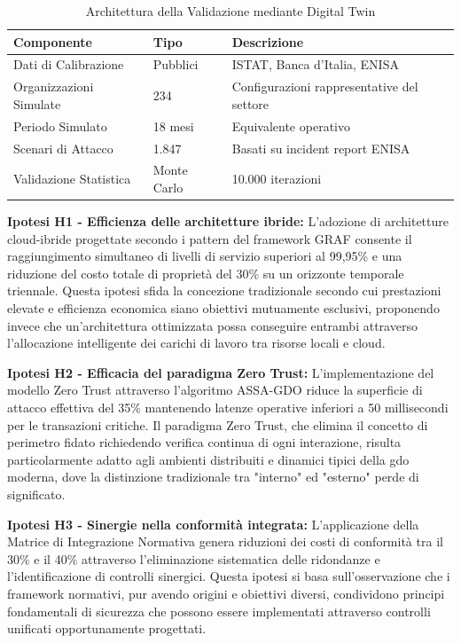 \begin{table}[h]
\centering
\caption{Architettura della Validazione mediante Digital Twin}
\begin{tabular}{|l|l|p{6cm}|}
\hline
\textbf{Componente} & \textbf{Tipo} & \textbf{Descrizione} \\
\hline
Dati di Calibrazione & Pubblici & ISTAT, Banca d'Italia, ENISA \\
Organizzazioni Simulate & 234 & Configurazioni rappresentative del settore \\
Periodo Simulato & 18 mesi & Equivalente operativo \\
Scenari di Attacco & 1.847 & Basati su incident report ENISA \\
Validazione Statistica & Monte Carlo & 10.000 iterazioni \\
\hline
\end{tabular}
\end{table}

\textbf{Ipotesi H1 - Efficienza delle architetture ibride:} L'adozione di architetture cloud-ibride progettate secondo i pattern del framework GRAF consente il raggiungimento simultaneo di livelli di servizio superiori al 99,95\% e una riduzione del costo totale di proprietà del 30\% su un orizzonte temporale triennale. Questa ipotesi sfida la concezione tradizionale secondo cui prestazioni elevate e efficienza economica siano obiettivi mutuamente esclusivi, proponendo invece che un'architettura ottimizzata possa conseguire entrambi attraverso l'allocazione intelligente dei carichi di lavoro tra risorse locali e cloud.

\textbf{Ipotesi H2 - Efficacia del paradigma Zero Trust:} L'implementazione del modello Zero Trust attraverso l'algoritmo ASSA-GDO riduce la superficie di attacco effettiva del 35\% mantenendo latenze operative inferiori a 50 millisecondi per le transazioni critiche. Il paradigma Zero Trust, che elimina il concetto di perimetro fidato richiedendo verifica continua di ogni interazione, risulta particolarmente adatto agli ambienti distribuiti e dinamici tipici della \gls{gdo} moderna, dove la distinzione tradizionale tra "interno" ed "esterno" perde di significato.

\textbf{Ipotesi H3 - Sinergie nella conformità integrata:} L'applicazione della Matrice di Integrazione Normativa genera riduzioni dei costi di conformità tra il 30\% e il 40\% attraverso l'eliminazione sistematica delle ridondanze e l'identificazione di controlli sinergici. Questa ipotesi si basa sull'osservazione che i framework normativi, pur avendo origini e obiettivi diversi, condividono principi fondamentali di sicurezza che possono essere implementati attraverso controlli unificati opportunamente progettati.

